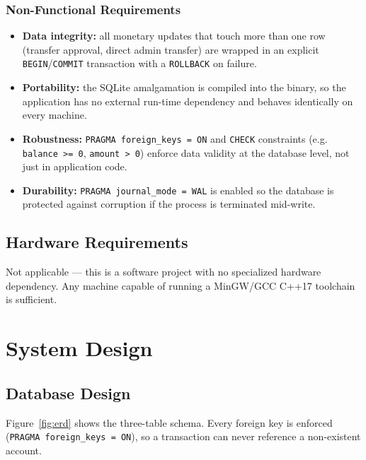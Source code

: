 \subsubsection{Non-Functional Requirements}
\begin{itemize}
    \item \textbf{Data integrity:} all monetary updates that touch more than one row (transfer approval, direct admin transfer) are wrapped in an explicit \texttt{BEGIN}/\texttt{COMMIT} transaction with a \texttt{ROLLBACK} on failure.
    \item \textbf{Portability:} the SQLite amalgamation is compiled into the binary, so the application has no external run-time dependency and behaves identically on every machine.
    \item \textbf{Robustness:} \texttt{PRAGMA foreign\_keys = ON} and \texttt{CHECK} constraints (e.g. \texttt{balance >= 0}, \texttt{amount > 0}) enforce data validity at the database level, not just in application code.
    \item \textbf{Durability:} \texttt{PRAGMA journal\_mode = WAL} is enabled so the database is protected against corruption if the process is terminated mid-write.
\end{itemize}

\subsection{Hardware Requirements}
Not applicable --- this is a software project with no specialized hardware dependency. Any machine capable of running a MinGW/GCC C++17 toolchain is sufficient.

\section{System Design}

\subsection{Database Design}
Figure~\ref{fig:erd} shows the three-table schema. Every foreign key is enforced (\texttt{PRAGMA foreign\_keys = ON}), so a transaction can never reference a non-existent account.

